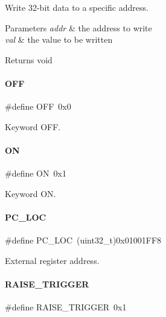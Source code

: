 Write 32-\/bit data to a specific address. 


\begin{DoxyParams}{Parameters}
{\em addr} & the address to write \\
\hline
{\em val} & the value to be written \\
\hline
\end{DoxyParams}
\begin{DoxyReturn}{Returns}
void 
\end{DoxyReturn}
\mbox{\label{a00020_a29e413f6725b2ba32d165ffaa35b01e5}} 
\paragraph{\texorpdfstring{O\+FF}{OFF}}
{\footnotesize\ttfamily \#define O\+FF~0x0}

Keyword O\+FF. \mbox{\label{a00020_ad76d1750a6cdeebd506bfcd6752554d2}} 
\paragraph{\texorpdfstring{ON}{ON}}
{\footnotesize\ttfamily \#define ON~0x1}

Keyword ON. \mbox{\label{a00020_a61c6c3e2790298ca9bef424e17010ae5}} 
\paragraph{\texorpdfstring{P\+C\+\_\+\+L\+OC}{PC\_LOC}}
{\footnotesize\ttfamily \#define P\+C\+\_\+\+L\+OC~(uint32\+\_\+t)0x01001\+F\+F8}

External register address. \mbox{\label{a00020_abda90eda34a640b130f48a6ade23fe22}} 
\paragraph{\texorpdfstring{R\+A\+I\+S\+E\+\_\+\+T\+R\+I\+G\+G\+ER}{RAISE\_TRIGGER}}
{\footnotesize\ttfamily \#define R\+A\+I\+S\+E\+\_\+\+T\+R\+I\+G\+G\+ER~0x1}

